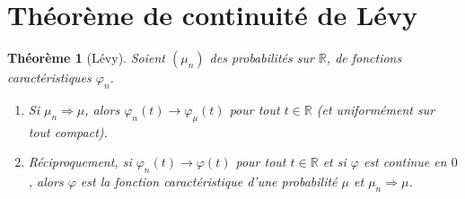 \documentclass[11pt]{article}
\newcommand{\R}{\mathbb{R}}
\newcommand{\weak}{\Rightarrow}
\theoremstyle{plain}
\newtheorem{theoreme}{Théorème}
\theoremstyle{definition}
\theoremstyle{remark}
\begin{document}
\section{Théorème de continuité de Lévy}

\begin{theoreme}[Lévy]\label{th:levy}
Soient $(\mu_n)$ des probabilités sur $\R$, de fonctions caractéristiques $\varphi_n$.
\begin{enumerate}[label=\textup{(\alph*)},leftmargin=2.2em]
\item Si $\mu_n\weak\mu$, alors $\varphi_n(t)\to\varphi_\mu(t)$ pour tout $t\in\R$
(et uniformément sur tout compact).
\item Réciproquement, si $\varphi_n(t)\to\varphi(t)$ pour tout $t\in\R$ et si $\varphi$ est
\emph{continue en $0$}, alors $\varphi$ est la fonction caractéristique d'une probabilité $\mu$ et
$\mu_n\weak\mu$.
\end{enumerate}
\end{theoreme}
\end{document}
